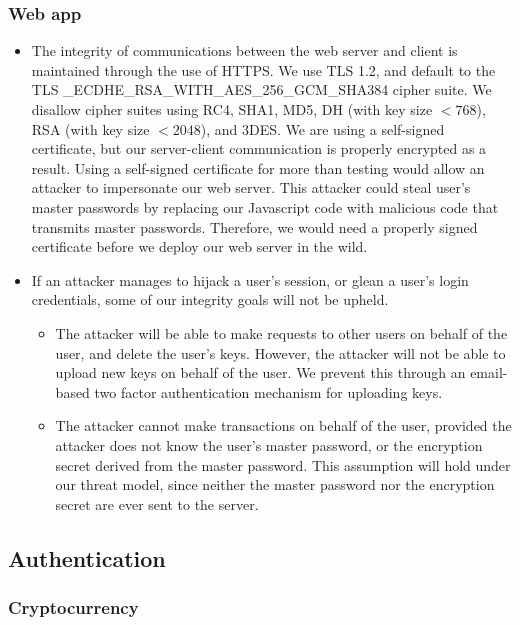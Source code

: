 \documentclass[12pt]{article}
\begin{document}
\subsubsection*{Web app}

\begin{itemize}
	\item The integrity of communications between the web server and client is maintained through the use of HTTPS.
	We use TLS 1.2, and default to the TLS \_ECDHE\_RSA\_WITH\_AES\_256\_GCM\_SHA384 cipher suite.
	We disallow cipher suites using RC4, SHA1, MD5, DH (with key size $< 768$), RSA (with key size $< 2048$), and 3DES.
	We are using a self-signed certificate, but our server-client communication is properly encrypted as a result.
	Using a self-signed certificate for more than testing would allow an attacker to impersonate our web server. This attacker could steal user's master passwords by replacing our Javascript code with malicious code that transmits master passwords.
	Therefore, we would need a properly signed certificate before we deploy our web server in the wild.

	\item If an attacker manages to hijack a user's session, or glean a user's login credentials, some of our integrity goals will not be upheld.
	\begin{itemize}
		\item The attacker will be able to make requests to other users on behalf of the user, and delete the user's keys.
		However, the attacker will not be able to upload new keys on behalf of the user.
		We prevent this through an email-based two factor authentication mechanism for uploading keys.
		\item The attacker cannot make transactions on behalf of the user, provided the attacker does not know the user's master password, or the encryption secret derived from the master password.
		This assumption will hold under our threat model, since neither the master password nor the encryption secret are ever sent to the server.
	\end{itemize}
\end{itemize}

\subsection{Authentication}

\subsubsection*{Cryptocurrency}
\end{document}
